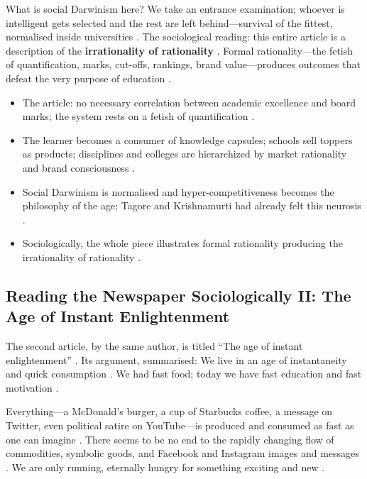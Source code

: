 \begin{KeyConcept}
What is social Darwinism here? We take an entrance examination; whoever is intelligent gets selected and the rest are left behind---survival of the fittest, normalised inside universities .
The sociological reading: this entire article is a description of the \textbf{irrationality of rationality} . Formal rationality---the fetish of quantification, marks, cut-offs, rankings, brand value---produces outcomes that defeat the very purpose of education .
\end{KeyConcept}

\begin{QuickRevision}
\begin{itemize}
    \item The article: no necessary correlation between academic excellence and board marks; the system rests on a fetish of quantification .
    \item The learner becomes a consumer of knowledge capsules; schools sell toppers as products; disciplines and colleges are hierarchized by market rationality and brand consciousness .
    \item Social Darwinism is normalised and hyper-competitiveness becomes the philosophy of the age; Tagore and Krishnamurti had already felt this neurosis .
    \item Sociologically, the whole piece illustrates formal rationality producing the irrationality of rationality .
\end{itemize}
\end{QuickRevision}

\subsection{Reading the Newspaper Sociologically II: The Age of Instant Enlightenment}
The second article, by the same author, is titled ``The age of instant enlightenment'' . Its argument, summarised:
We live in an age of instantaneity and quick consumption . We had fast food; today we have fast education and fast motivation .

Everything---a McDonald's burger, a cup of Starbucks coffee, a message on Twitter, even political satire on YouTube---is produced and consumed as fast as one can imagine . There seems to be no end to the rapidly changing flow of commodities, symbolic goods, and Facebook and Instagram images and messages . We are only running, eternally hungry for something exciting and new .

